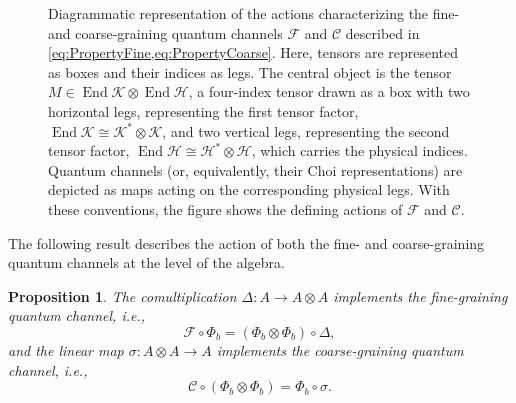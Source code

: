 \documentclass[a4paper,10pt]{amsart}
\newcommand{\Fine}{\mathcal{F}}
\newcommand{\Coarse}{\mathcal{C}}
\newtheorem{proposition}[theorem]{Proposition}
\theoremstyle{definition}
\begin{document}
\begin{figure}
    \caption{
    Diagrammatic representation of the actions characterizing the fine- and coarse-graining quantum channels $\Fine$ and $\Coarse$ described in \cref{eq:PropertyFine,eq:PropertyCoarse}.
    Here, tensors are represented as boxes and their indices as legs. The central object is the tensor $M\in\operatorname{End}\mathscr{K}\otimes\operatorname{End}\mathscr{H}$, a four-index tensor drawn as a box with two horizontal legs, representing the first tensor factor, $\operatorname{End}\mathscr{K}\cong\mathscr{K}^*\otimes\mathscr{K}$, and two vertical legs, representing the second tensor factor, $\operatorname{End}\mathscr{H}\cong\mathscr{H}^*\otimes\mathscr{H}$, which carries the physical indices.
    Quantum channels (or, equivalently, their Choi representations) are depicted as maps acting on the corresponding physical legs.
    With these conventions, the figure shows the defining actions of $\Fine$ and $\Coarse$.}
    \label{fig:FC}
\end{figure}
The following result describes the action of both the fine- and coarse-graining quantum channels at the level of the algebra.

\begin{proposition}\label{prop:sigma_is_S}
	The comultiplication $\Delta :A\to A\otimes A$ implements the fine-graining quantum channel, i.e.,
	\begin{equation}
		\label{eq:PropertyT}
        \Fine \circ \Phi_b = (\Phi_b\otimes \Phi_b) \circ \Delta,
	\end{equation}
    and the linear map $\sigma:A\otimes A\to A$ implements the coarse-graining quantum channel, i.e.,
	\begin{equation}
		\label{eq:PropertyS}
        \Coarse \circ (\Phi_b\otimes \Phi_b) = \Phi_b \circ \sigma.
	\end{equation}
\end{proposition}
\end{document}
